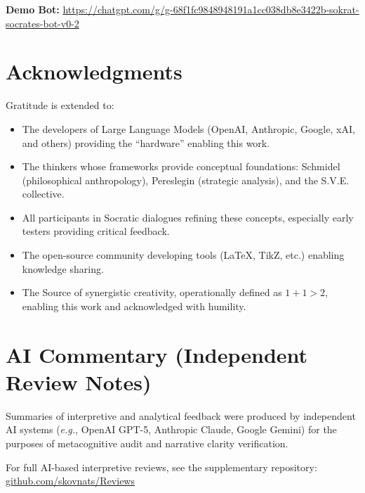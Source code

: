 \documentclass[11pt,a4paper]{article}
\theoremstyle{definition}
\theoremstyle{remark}
\begin{document}
\begin{center}
\textbf{Demo Bot:} \url{https://chatgpt.com/g/g-68f1fc9848948191a1cc038db8e3422b-sokrat-socrates-bot-v0-2}
\end{center}

\section*{Acknowledgments}

Gratitude is extended to:

\begin{itemize}
    \item The developers of Large Language Models (OpenAI, Anthropic, Google, xAI, and others) providing the ``hardware'' enabling this work.
    
    \item The thinkers whose frameworks provide conceptual foundations: Schmidel (philosophical anthropology), Pereslegin (strategic analysis), and the S.V.E. collective.
    
    \item All participants in Socratic dialogues refining these concepts, especially early testers providing critical feedback.
    
    \item The open-source community developing tools (LaTeX, TikZ, etc.) enabling knowledge sharing.
    
    \item The Source of synergistic creativity, operationally defined as $1+1>2$, enabling this work and acknowledged with humility.
\end{itemize}

\section*{AI Commentary (Independent Review Notes)}
Summaries of interpretive and analytical feedback were produced by independent AI systems 
(\textit{e.g.}, OpenAI GPT-5, Anthropic Claude, Google Gemini) 
for the purposes of metacognitive audit and narrative clarity verification.  

For full AI-based interpretive reviews, see the supplementary repository:  
\href{https://codeberg.org/skovnats/SVE-Systemic-Verification-Engineering/tree/master/Reviews}{github.com/skovnats/Reviews}
\end{document}
